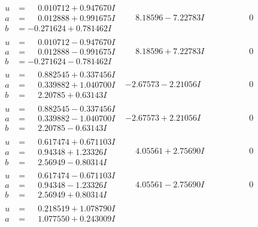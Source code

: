 \documentclass[1p]{elsarticle_modified}
\theoremstyle{definition}
\begin{document}
$$\begin{array}{c|c|c}
\begin{aligned}
u &= \phantom{-}0.010712 + 0.947670 I \\
a &= \phantom{-}0.012888 + 0.991675 I \\
b &= -0.271624 + 0.781462 I\end{aligned}
 & \phantom{-}8.18596 - 7.22783 I & \phantom{-0.000000 } 0 \\ \hline\begin{aligned}
u &= \phantom{-}0.010712 - 0.947670 I \\
a &= \phantom{-}0.012888 - 0.991675 I \\
b &= -0.271624 - 0.781462 I\end{aligned}
 & \phantom{-}8.18596 + 7.22783 I & \phantom{-0.000000 } 0 \\ \hline\begin{aligned}
u &= \phantom{-}0.882545 + 0.337456 I \\
a &= \phantom{-}0.339882 + 1.040700 I \\
b &= \phantom{-}2.20785 + 0.63143 I\end{aligned}
 & -2.67573 - 2.21056 I & \phantom{-0.000000 } 0 \\ \hline\begin{aligned}
u &= \phantom{-}0.882545 - 0.337456 I \\
a &= \phantom{-}0.339882 - 1.040700 I \\
b &= \phantom{-}2.20785 - 0.63143 I\end{aligned}
 & -2.67573 + 2.21056 I & \phantom{-0.000000 } 0 \\ \hline\begin{aligned}
u &= \phantom{-}0.617474 + 0.671103 I \\
a &= \phantom{-}0.94348 + 1.23326 I \\
b &= \phantom{-}2.56949 - 0.80314 I\end{aligned}
 & \phantom{-}4.05561 + 2.75690 I & \phantom{-0.000000 } 0 \\ \hline\begin{aligned}
u &= \phantom{-}0.617474 - 0.671103 I \\
a &= \phantom{-}0.94348 - 1.23326 I \\
b &= \phantom{-}2.56949 + 0.80314 I\end{aligned}
 & \phantom{-}4.05561 - 2.75690 I & \phantom{-0.000000 } 0 \\ \hline\begin{aligned}
u &= \phantom{-}0.218519 + 1.078790 I \\
a &= \phantom{-}1.077550 + 0.243009 I \\

\end{aligned}
\end{array}$$
\end{document}
